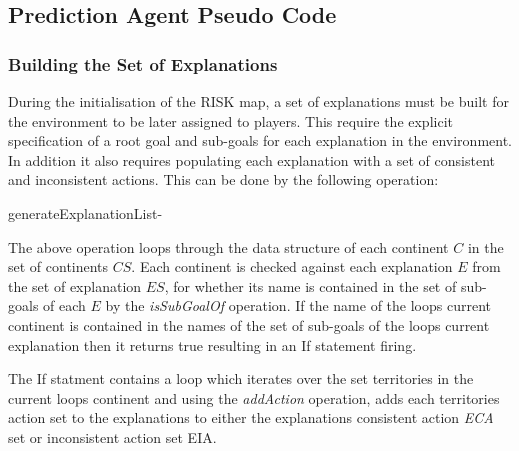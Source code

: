 \documentclass[parskip]{cs4rep}
\begin{document}
\subsection{Prediction Agent Pseudo Code}

\subsubsection{Building the Set of Explanations}

During the initialisation of the RISK map, a set of explanations must be built for the environment to be later assigned to players. This require the explicit specification of a root goal and sub-goals for each explanation in the environment. In addition it also requires populating each explanation with a set of consistent and inconsistent actions. This can be done by the following operation:

\begin{pseudocode}[ruled]{generateExplanationList}{-}
\begin{algorithm}[H]
\end{algorithm}
\end{pseudocode}

The above operation loops through the data structure of each continent $C$ in the set of continents $CS$. Each continent is checked against each explanation $E$ from the set of explanation $ES$, for whether its name is contained in the set of sub-goals of each $E$ by the \textit{isSubGoalOf} operation. If the name of the loops current continent is contained in the names of the set of sub-goals of the loops current explanation then it returns true resulting in an If statement firing. 

The If statment contains a loop which iterates over the set territories in the current loops continent and using the \textit{addAction} operation, adds each territories action set to the explanations to either the explanations consistent action \textit{ECA} set or inconsistent action set {EIA}.
\end{document}
